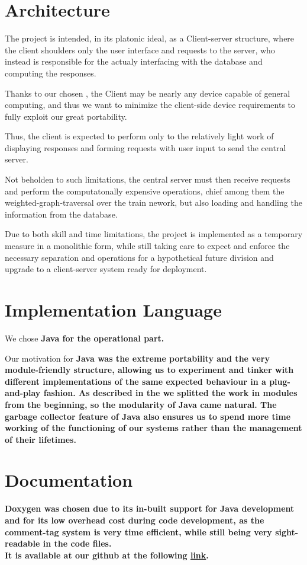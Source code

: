 \section{Architecture}
The project is intended, in its platonic ideal, as a Client-server structure, where the client shoulders only the user interface and requests to the server, who instead is responsible for the actualy interfacing with the database and computing the responses.

Thanks to our chosen , the Client may be nearly any device capable of general computing, and thus we want to minimize the client-side device requirements to fully exploit our great portability. 

Thus, the client is expected to perform only to the relatively light work of displaying responses and forming requests with user input to send the central server.

Not beholden to such limitations, the central server must then receive requests and perform the computatonally expensive operations, chief among them the weighted-graph-traversal over the train nework, but also loading and handling the information from the database.

Due to both skill and time limitations, the project is implemented as a temporary measure in a monolithic form, while still taking care to expect and enforce the necessary separation and operations for a hypothetical future division and upgrade to a client-server system ready for deployment.

\section{Implementation Language}\label{Implementation Language}
We chose \bf{Java} for the operational part.


Our motivation for \bf{Java} was the extreme portability and the very module-friendly structure, allowing us to experiment and tinker with different implementations of the same expected behaviour in a plug-and-play fashion. As described in the  we splitted the work in modules from the beginning, so the modularity of \bf{Java} came natural.
The garbage collector feature of \bf{Java} also ensures us to spend more time working of the functioning of our systems rather than the management of their lifetimes.

\section{Documentation}\label{Documentation}
\bf{Doxygen} was chosen due to its in-built support for \bf{Java} development and for its low overhead cost during code development, as the comment-tag system is very time efficient, while still being very sight-readable in the code files.\\
It is available at our github at the following \href{https://github.com/DispatchNet/TRE/tree/userD/D3_DispatchNet/code/docs/html/index.html}{link}.

